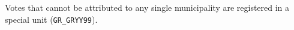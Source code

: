 Votes that cannot be attributed to any single municipality
are registered in a special unit (\texttt{GR\_GRYY99}).